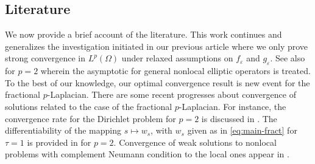 \documentclass[12pt, reqno]{amsart}%
\theoremstyle{plain}  %
\theoremstyle{definition}  %
\numberwithin{equation}{section}
\newcommand{\eps}{\varepsilon}
\begin{document}
\vspace{-1mm}
\subsection{Literature}
We now provide a brief account of the literature. This work continues and generalizes the investigation initiated in our previous article \cite{Fog25} where we only prove strong convergence in $L^p(\Omega)$ under relaxed assumptions on $f_\eps$ and $ g_\eps$.  See also \cite{guy-thesis,FoKa24} for $p=2$ wherein the asymptotic for general nonlocal elliptic operators is treated. To the best of our knowledge, our optimal convergence result is new event for the fractional $p$-Laplacian. There are some recent progresses about convergence of solutions related to the case of the fractional $p$-Laplacian. For instance, the convergence rate for the Dirichlet problem for $p=2$ is discussed in \cite{BuFe25}. The differentiability of the mapping $s\mapsto w_s$, with $w_s$ given as in \eqref{eq:main-fract} for $\tau=1$ is provided in \cite{JSW25} for $p=2$.
Convergence  of weak solutions to nonlocal  problems with complement Neumann condition to the local ones appear in \cite{guy-thesis,FoKa24,GrHe24}.
\end{document}

